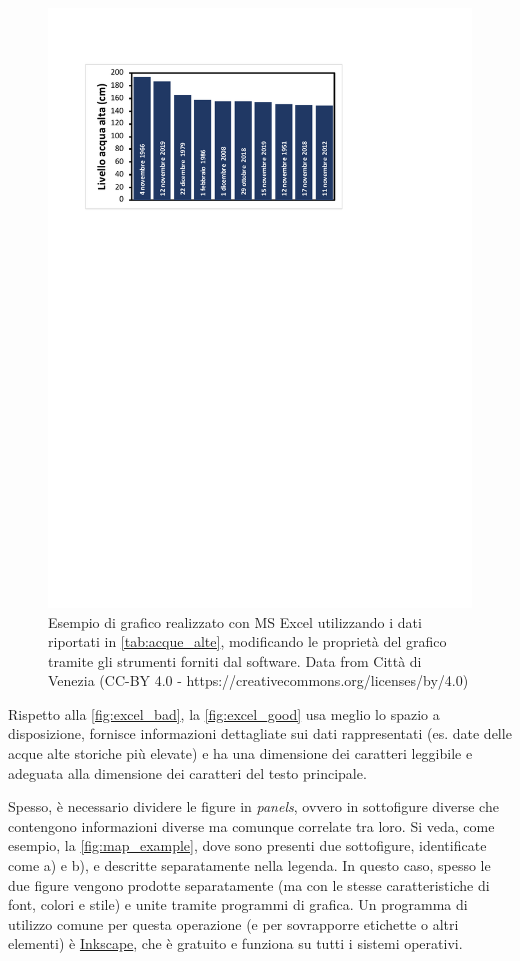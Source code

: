 \documentclass[9pt,a4paper,twoside]{rho-class/rho}
\begin{document}
\begin{figure}[h!]
    \centering
    \includegraphics[width=0.9\linewidth]{figures/graph_custom.pdf}
    \caption{Esempio di grafico realizzato con MS Excel utilizzando i dati riportati in \autoref{tab:acque_alte}, modificando le proprietà del grafico tramite gli strumenti forniti dal software. Data from Città di Venezia (CC-BY 4.0 - https://creativecommons.org/licenses/by/4.0)}
    \label{fig:excel_good}
\end{figure}

Rispetto alla \autoref{fig:excel_bad}, la \autoref{fig:excel_good} usa meglio lo spazio a disposizione, fornisce informazioni dettagliate sui dati rappresentati (es. date delle acque alte storiche più elevate) e ha una dimensione dei caratteri leggibile e adeguata alla dimensione dei caratteri del testo principale.

Spesso, è necessario dividere le figure in \textit{panels}, ovvero in sottofigure diverse che contengono informazioni diverse ma comunque correlate tra loro. Si veda, come esempio, la \autoref{fig:map_example}, dove sono presenti due sottofigure, identificate come a) e b), e descritte separatamente nella legenda. In questo caso, spesso le due figure vengono prodotte separatamente (ma con le stesse caratteristiche di font, colori e stile) e unite tramite programmi di grafica. Un programma di utilizzo comune per questa operazione (e per sovrapporre etichette o altri elementi) è \href{https://inkscape.org}{Inkscape}, che è gratuito e funziona su tutti i sistemi operativi.
\end{document}
